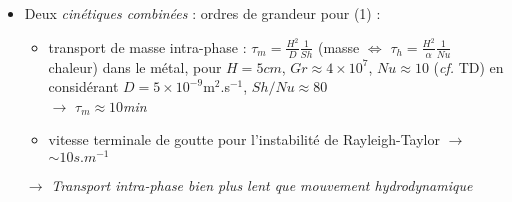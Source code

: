 \begin{frame}
\begin{itemize}
\begin{itemize}
      \end{itemize}
      \item Deux \emph{cinétiques combinées} : ordres de grandeur pour \textcolor{OliveGreen}{(1)} :
      \begin{itemize}
\item transport de masse intra-phase : $\tau_m = \frac{H^2}{D} \frac{1}{Sh}$ (masse $\Leftrightarrow$ $\tau_h = \frac{H^2}{\alpha} \frac{1}{Nu}$ chaleur)
dans le métal, pour $H=5cm$, $Gr\approx4\times 10^{7}$, $Nu\approx10$ (\textit{cf.} TD)
en considérant $D=5\times 10^{-9}$m$^2$.s$^{-1}$, $Sh/Nu\approx80$ \\$\rightarrow$ \emph{$\tau_m \approx 10$min}
\item vitesse terminale de goutte pour l'instabilité de Rayleigh-Taylor $\rightarrow$ \emph{$\sim 10s.m^{-1}$}
      \end{itemize}
      \hskip -0.5cm $\rightarrow$ \emph{Transport intra-phase bien plus lent que mouvement hydrodynamique}
\end{itemize}
    \end{frame}
